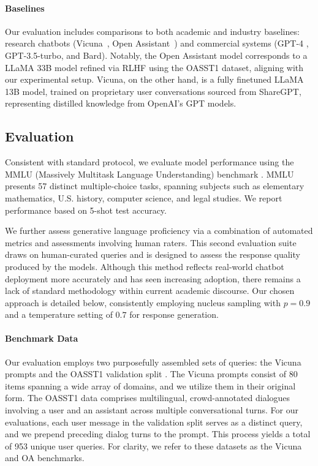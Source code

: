 \paragraph{Baselines}
Our evaluation includes comparisons to both academic and industry baselines: research chatbots (Vicuna~\citep{vicuna2023}, Open Assistant~\citep{kopf2023openassistant}) and commercial systems (GPT-4 \citep{openai2023gpt}, GPT-3.5-turbo, and Bard). Notably, the Open Assistant model corresponds to a LLaMA 33B model refined via RLHF using the OASST1 dataset, aligning with our experimental setup. Vicuna, on the other hand, is a fully finetuned LLaMA 13B model, trained on proprietary user conversations sourced from ShareGPT, representing distilled knowledge from OpenAI’s GPT models.

\subsection{Evaluation}

Consistent with standard protocol, we evaluate model performance using the MMLU (Massively Multitask Language Understanding) benchmark \citep{hendrycksmeasuring}. MMLU presents 57 distinct multiple-choice tasks, spanning subjects such as elementary mathematics, U.S. history, computer science, and legal studies. We report performance based on 5-shot test accuracy.

We further assess generative language proficiency via a combination of automated metrics and assessments involving human raters. This second evaluation suite draws on human-curated queries and is designed to assess the response quality produced by the models. Although this method reflects real-world chatbot deployment more accurately and has seen increasing adoption, there remains a lack of standard methodology within current academic discourse. Our chosen approach is detailed below, consistently employing nucleus sampling with $p=0.9$ and a temperature setting of $0.7$ for response generation.

\paragraph{Benchmark Data} Our evaluation employs two purposefully assembled sets of queries: the Vicuna prompts \citep{vicuna2023} and the OASST1 validation split \citep{kopf2023openassistant}. The Vicuna prompts consist of 80 items spanning a wide array of domains, and we utilize them in their original form. The OASST1 data comprises multilingual, crowd-annotated dialogues involving a user and an assistant across multiple conversational turns. For our evaluations, each user message in the validation split serves as a distinct query, and we prepend preceding dialog turns to the prompt. This process yields a total of 953 unique user queries. For clarity, we refer to these datasets as the Vicuna and OA benchmarks.

